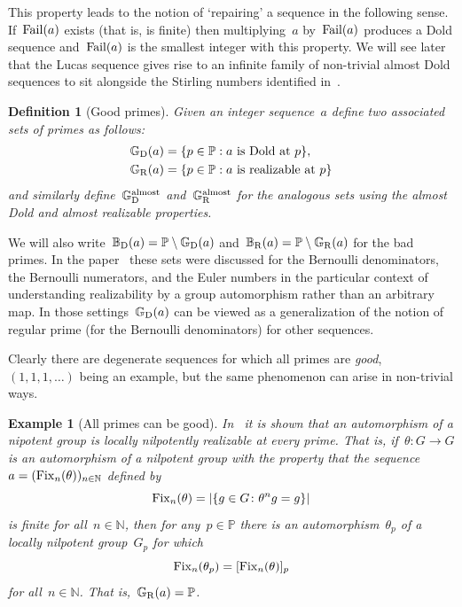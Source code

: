 \documentclass[]{interact}
\theoremstyle{plain}
\numberwithin{equation}{section} %
\newtheorem{example}[thm]{Example}
\newtheorem{definition}[thm]{Definition}
\numberwithin{table}{section} %
\numberwithin{figure}{section}
\def\NN{\mathbb{N}}
\def\PP{\mathbb{P}}
\def\gooddoldprimes{\mathbb{G}_{\rm{D}}}
\def\baddoldprimes{\mathbb{B}_{\rm{D}}}
\def\goodrealizableprimes{\mathbb{G}_{\rm{R}}}
\def\badrealizableprimes{\mathbb{B}_{\rm{R}}}
\newcommand\failure{{\rm{Fail}}}
\newcommand\fix{{\rm{Fix}}}
\begin{document}
This property leads to the notion of `repairing' a sequence
in the following sense. If~$\failure(a)$ exists (that is, is finite)
then multiplying~$a$ by~$\failure(a)$ produces a Dold sequence
and~$\failure(a)$ is the smallest integer with this property.
We will see later that the Lucas sequence gives rise
to an infinite family of non-trivial almost Dold sequences
to sit alongside the Stirling numbers identified in~\cite{MR4361581}.

\begin{definition}[Good primes]
Given an integer sequence~$a$ define two
associated sets of
primes as follows:
\begin{align*}
\gooddoldprimes(a)
&=
\{p\in\PP :
a\mbox{ is Dold at }p\},\\
\goodrealizableprimes(a)
&=
\{p\in\PP :
a\mbox{ is realizable at }p\}
\end{align*}
and similarly define~$\gooddoldprimes^{\text{almost}}$ and~$\goodrealizableprimes^{\text{almost}}$
for the analogous sets using the almost Dold and almost realizable
properties.
\end{definition}

We will also write~$\baddoldprimes(a)=\PP\setminus\gooddoldprimes(a)$
and~$\badrealizableprimes(a)=\PP\setminus\goodrealizableprimes(a)$
for the bad primes.
In the paper~\cite{MR5076929} these sets were discussed
for the Bernoulli denominators, the Bernoulli
numerators, and the Euler numbers in the particular
context of understanding realizability by a group
automorphism rather than an arbitrary map.
In those settings~$\gooddoldprimes(a)$ can be
viewed as a generalization of the notion of
regular prime (for the Bernoulli denominators)
for other sequences.

Clearly there are degenerate sequences for which all
primes are \emph{good},~$(1,1,1,\dots)$ being an example,
but the same phenomenon can arise in non-trivial ways.

\begin{example}[All primes can be good]
In~{\rm{\cite[Th.~4]{MR5076929}}} it is shown that an automorphism of
a nipotent group is locally nilpotently realizable at every
prime. That is, if~$\theta\colon G\to G$ is an automorphism
of a nilpotent group with the property that the
sequence~$a=(\fix_n(\theta))_{n\in\NN}$ defined by
\[
\fix_n(\theta)
=
\vert\{g\in G\colon\theta^ng=g\}\vert
\]
is finite for all~$n\in\NN$, then for any~$p\in\PP$
there is an automorphism~$\theta_p$ of a locally
nilpotent group~$G_p$ for which
\[
\fix_n(\theta_p)=[\fix_n(\theta)]_p
\]
for all~$n\in\NN$. That is,~$\goodrealizableprimes(a)=\PP$.
\end{example}
\end{document}
